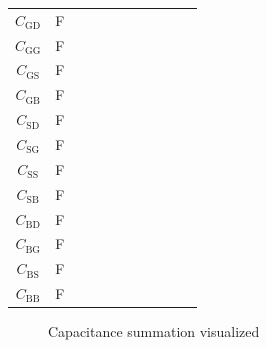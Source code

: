 \documentclass{article}[11pt]
\begin{document}
\begin{table}[H]
\begin{tabular}{cccccccc}
$C_{\mathrm{GD}}$                           & \si{\farad}          &  ~         &  ~         &  ~         &     ~      &  ~         &     ~      \\
$C_{\mathrm{GG}}$                           & \si{\farad}          &  ~         &  ~         &  ~         &     ~      &  ~         &     ~      \\
$C_{\mathrm{GS}}$                           & \si{\farad}          &  ~         &  ~         &  ~         &     ~      &  ~         &     ~      \\
$C_{\mathrm{GB}}$                           & \si{\farad}          &  ~         &  ~         &  ~         &     ~      &  ~         &     ~      \\ 
$C_{\mathrm{SD}}$                           & \si{\farad}          &  ~         &  ~         &  ~         &     ~      &  ~         &     ~      \\
$C_{\mathrm{SG}}$                           & \si{\farad}          &  ~         &  ~         &  ~         &     ~      &  ~         &     ~      \\
$C_{\mathrm{SS}}$                           & \si{\farad}          &  ~         &  ~         &  ~         &     ~      &  ~         &     ~      \\
$C_{\mathrm{SB}}$                           & \si{\farad}          &  ~         &  ~         &  ~         &     ~      &  ~         &     ~      \\ 
$C_{\mathrm{BD}}$                           & \si{\farad}          &  ~         &  ~         &  ~         &     ~      &  ~         &     ~      \\
$C_{\mathrm{BG}}$                           & \si{\farad}          &  ~         &  ~         &  ~         &     ~      &  ~         &     ~      \\
$C_{\mathrm{BS}}$                           & \si{\farad}          &  ~         &  ~         &  ~         &     ~      &  ~         &     ~      \\
$C_{\mathrm{BB}}$                           & \si{\farad}          &  ~         &  ~         &  ~         &     ~      &  ~         &     ~      \\ \midrule 
\end{tabular}
\label{tab:regions}
\end{table}


\begin{figure}[H]
  \centering
  \begin{tikzpicture}[scale=0.9]
    
  \end{tikzpicture}
  \caption{Capacitance summation visualized}
  \label{fig:x2}
\end{figure}
\end{document}
